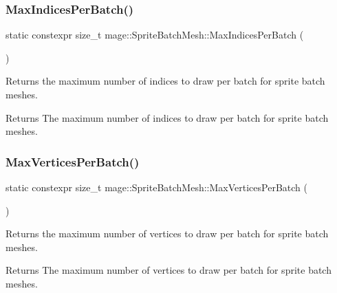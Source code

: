 \subsubsection{\texorpdfstring{Max\+Indices\+Per\+Batch()}{MaxIndicesPerBatch()}}
{\footnotesize\ttfamily static constexpr size\+\_\+t mage\+::\+Sprite\+Batch\+Mesh\+::\+Max\+Indices\+Per\+Batch (\begin{DoxyParamCaption}{ }\end{DoxyParamCaption})\hspace{0.3cm}{\ttfamily [static]}}

Returns the maximum number of indices to draw per batch for sprite batch meshes.

\begin{DoxyReturn}{Returns}
The maximum number of indices to draw per batch for sprite batch meshes. 
\end{DoxyReturn}
\hypertarget{classmage_1_1_sprite_batch_mesh_aa4253546e06f3faac0d8287d894a5655}{}\label{classmage_1_1_sprite_batch_mesh_aa4253546e06f3faac0d8287d894a5655} 
\subsubsection{\texorpdfstring{Max\+Vertices\+Per\+Batch()}{MaxVerticesPerBatch()}}
{\footnotesize\ttfamily static constexpr size\+\_\+t mage\+::\+Sprite\+Batch\+Mesh\+::\+Max\+Vertices\+Per\+Batch (\begin{DoxyParamCaption}{ }\end{DoxyParamCaption})\hspace{0.3cm}{\ttfamily [static]}}

Returns the maximum number of vertices to draw per batch for sprite batch meshes.

\begin{DoxyReturn}{Returns}
The maximum number of vertices to draw per batch for sprite batch meshes. 
\end{DoxyReturn}
\hypertarget{classmage_1_1_sprite_batch_mesh_aca5b4cf24139e77ef1fcf54196d8e3ca}{}\label{classmage_1_1_sprite_batch_mesh_aca5b4cf24139e77ef1fcf54196d8e3ca} 
